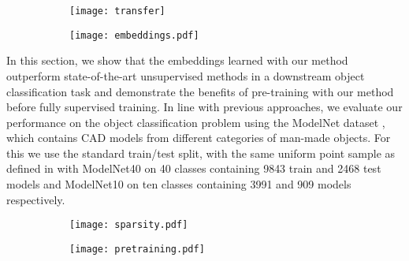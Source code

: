 \documentclass{article}
\begin{document}
\begin{figure}[b]
\vskip -0.1in
\begin{center}
 \captionsetup[subfigure]{width=0.95\linewidth}
  \begin{subfigure}{.49\linewidth}
    \centerline{\texttt{[image: transfer]}}
\vskip -0.1in
\label{transfer}
\end{subfigure}
  \begin{subfigure}{.49\linewidth}
  \centerline{\texttt{[image: embeddings.pdf]}}
\vskip -0.1in
    \label{embeddings}

  \end{subfigure}\end{center}
\vskip -0.1in
    \caption{}
\end{figure}

In this section, we show that the embeddings learned with our method outperform state-of-the-art unsupervised methods in a downstream object classification task and demonstrate the benefits of pre-training with our method before fully supervised training. In line with previous approaches, we evaluate our performance on the object classification problem using the ModelNet dataset \cite{modelnet}, which contains CAD models from different categories of man-made objects. For this we use the standard train/test split, with the same uniform point sample as defined in \cite{pointnet} with ModelNet40 on 40 classes containing 9843 train and 2468 test models and ModelNet10 on ten classes containing 3991 and 909 models respectively.

\begin{figure}[t]
\begin{center}
 \captionsetup[subfigure]{width=0.95\linewidth}
\begin{subfigure}{.49\linewidth}
\centerline{\texttt{[image: sparsity.pdf]}}
\label{sparsity}
\end{subfigure}
\begin{subfigure}{.49\linewidth}
\centerline{\texttt{[image: pretraining.pdf]}}
\label{figsupervised}
\end{subfigure}
\end{center}
\vskip -0.1in
\caption{}
\vskip -0.2in
\end{figure}
\end{document}
